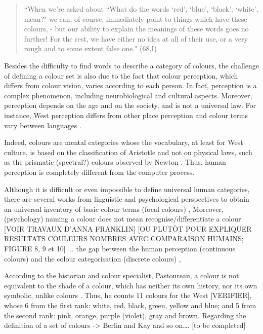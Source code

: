 \documentclass[11pt,a4paper]{article}
\begin{document}
\begin{quote}
	``When we're asked about ``What do the words `red', `blue', `black',
	`white', mean?" we can, of course, immediately point to things which
	have these colours, - but our ability to explain the meanings of these
	words goes no further! For the rest, we have either no idea at all of
	their use, or a very rough and to some extent false one." (68,I)
\end{quote}

Besides the difficulty to find words to describe a category of colours, the challenge of defining a colour set is also due to the fact that colour perception, which differs from colour vision, varies according to each person. In fact, perception is a complex phenomenon, including neurobiological and cultural aspects. 
Moreover, perception depends on the age and on the society, and is not a universal law. 
For instance, West perception differs from other place perception and colour terms vary between languages \cite[][p. 35 and p.87]{pastoureau2017}.

Indeed, colours are mental categories whose the vocabulary, at least for West culture, is based on the classification of Aristotle and not on physical laws, such as the prismatic (spectral?) colours observed by Newton 
\cite[][p. 12 and p. 90-91]{pastoureau2017}. Thus, human perception is completely different from the computer process.

Although it is difficult or even impossible to define universal human
categories, there are several works from linguistic and psychological perspectives to obtain an universal inventory of basic colour terms (focal colours) \cite[see e.g.]{berlinkay1969,RegierKayCook2005},  Moreover, (psychology) naming a colour does not mean recognise/differentiate a colour {[}VOIR TRAVAUX D'ANNA
FRANKLIN{]}  [OU PLUTÒT POUR EXPLIQUER RESULTATS COULEURS NOMBRES AVEC COMPARAISON HUMAINS; FIGURE 8, 9 et 10]
...
	the gap between the human perception (continuous colours) and the
colour categorisation (discrete colours)
\cite[see e.g.][]{parragaakbarinia2016}, 

According to the historian and colour specialist,
Pastoureau, a colour is not equivalent to the shade of a colour, which
has neither its own history, nor its own symbolic, unlike colours
\cite[][p. 12 and p. 63 and p. 183]{pastoureau2017}. Thus, he counts 11 colours for
the West {[}VERIFIER{]}, whose 6 from the first rank: white, red, black, green, yellow and blue; and 5 from the second rank: pink, orange, purple (violet), gray and brown.
 Regarding the definition of a set of
colours -\textgreater{} Berlin and Kay and so on\ldots{}. {[}to be
completed{]}
\end{document}
